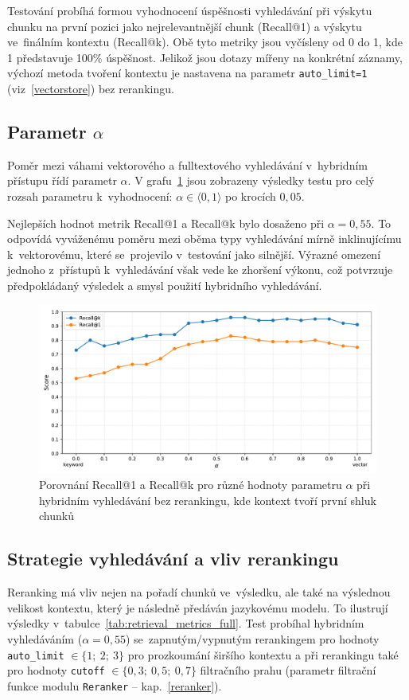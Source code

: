 Testování probíhá formou vyhodnocení úspěšnosti vyhledávání při výskytu chunku na první pozici jako nejrelevantnější chunk (Recall@1) a výskytu ve~finálním kontextu (Recall@k). Obě tyto metriky jsou vyčísleny od 0 do 1, kde 1 představuje 100\% úspěšnost. Jelikož jsou dotazy mířeny na konkrétní záznamy, výchozí metoda tvoření kontextu je nastavena na parametr \texttt{auto\_limit=1} (viz~\ref{vectorstore}) bez rerankingu.

\subsection{Parametr $\alpha$}
Poměr mezi váhami vektorového a fulltextového vyhledávání v~hybridním přístupu řídí parametr $\alpha$. V grafu~\ref{fig:alpha-recall} jsou zobrazeny výsledky testu pro celý rozsah parametru k~vyhodnocení: $\alpha \in \langle 0, 1 \rangle$ po krocích $0{,}05$.

Nejlepších hodnot metrik Recall@1 a Recall@k bylo dosaženo při $\alpha = 0{,}55$. To odpovídá vyváženému poměru mezi oběma typy vyhledávání mírně inklinujícímu k~vektorovému, které se~projevilo v~testování jako silnější. Výrazné omezení jednoho z~přístupů k~vyhledávání však vede ke zhoršení výkonu, což potvrzuje předpokládaný výsledek a smysl použití hybridního vyhledávání.

\begin{figure}[H]
    \centering
    \includegraphics[width=\linewidth]{obrazky/alpha_recall.pdf}
    \caption{Porovnání Recall@1 a Recall@k pro různé hodnoty parametru $\alpha$ při hybridním vyhledávání bez rerankingu, kde kontext tvoří první shluk chunků }
    \label{fig:alpha-recall}
\end{figure}

\subsection{Strategie vyhledávání a vliv rerankingu}
Reranking má vliv nejen na pořadí chunků ve~výsledku, ale také na výslednou velikost kontextu, který je následně předáván jazykovému modelu. To ilustrují výsledky v~tabulce~\ref{tab:retrieval_metrics_full}. Test probíhal hybridním vyhledáváním ($\alpha=0{,}55$) se~zapnutým/vypnutým rerankingem pro hodnoty \texttt{auto\_limit} $\in \{1;\ 2;\ 3\}$ pro prozkoumání širšího kontextu a při rerankingu také pro hodnoty \texttt{cutoff} $\in \{0{,}3;\ 0{,}5;\ 0{,}7\}$ filtračního prahu (parametr filtrační funkce modulu \texttt{Reranker} – kap.~\ref{reranker}). 

